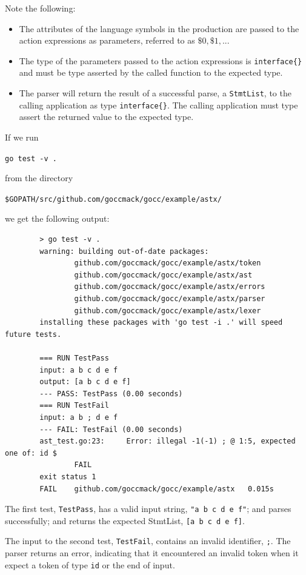 \documentclass[12pt]{article}
\begin{document}
	Note the following:

	\begin{itemize}
		\item The attributes of the language symbols in the production are passed to the action expressions as parameters, referred to as $\$0, \$1, ...$

		\item The type of the parameters passed to the action expressions is \verb|interface{}| and must be type asserted by the called function to the expected type.

		\item The parser will return the result of a successful parse, a \verb"StmtList", to the calling application as type \verb"interface{}". The calling application must type assert the returned value to the expected type.
	\end{itemize}

	If we run

	\verb"go test -v ."

	from the directory

	\verb|$GOPATH/src/github.com/goccmack/gocc/example/astx/|

	we get the following output:

	\begin{verbatim}
		> go test -v .
		warning: building out-of-date packages:
		        github.com/goccmack/gocc/example/astx/token
		        github.com/goccmack/gocc/example/astx/ast
		        github.com/goccmack/gocc/example/astx/errors
		        github.com/goccmack/gocc/example/astx/parser
		        github.com/goccmack/gocc/example/astx/lexer
		installing these packages with 'go test -i .' will speed future tests.

		=== RUN TestPass
		input: a b c d e f
		output: [a b c d e f]
		--- PASS: TestPass (0.00 seconds)
		=== RUN TestFail
		input: a b ; d e f
		--- FAIL: TestFail (0.00 seconds)
		ast_test.go:23: 	Error: illegal -1(-1) ; @ 1:5, expected one of: id $
		        FAIL
		exit status 1
		FAIL	github.com/goccmack/gocc/example/astx	0.015s	\end{verbatim}

	The first test, \verb"TestPass", has a valid input string, \verb|"a b c d e f"|; and parses successfully; and returns the expected StmtList, \verb|[a b c d e f]|.

	The input to the second test, \verb|TestFail|, contains an invalid identifier, \verb|;|. The parser returns an error, indicating that it encountered an invalid token when it expect a token of type \verb|id| or the end of input.
\end{document}

